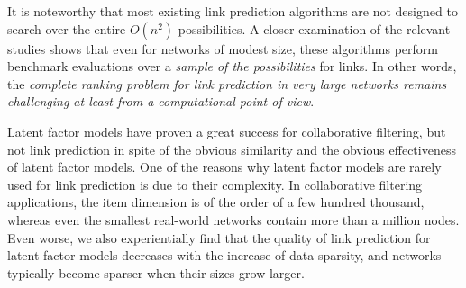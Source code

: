 It is noteworthy that most existing link prediction algorithms are not designed to search over the entire
$O(n^2)$ possibilities. A closer examination of the relevant
studies shows that even for networks of modest size, these
algorithms perform benchmark evaluations over a {\em
sample of the possibilities} for links.  In other
words, the {\em complete ranking problem for link prediction in
very large networks remains challenging at least from a
computational point of view}.


Latent factor models have proven a great success for
collaborative filtering, but not link prediction in spite of the obvious
similarity and
the obvious effectiveness of latent factor models. One of the reasons why latent factor models are rarely used for
link prediction is due to their complexity. In
collaborative filtering applications, the item dimension is of the
order of a few hundred thousand, whereas even the smallest  real-world networks contain more than a million nodes.
Even worse, we also experientially find that the quality of link prediction for latent factor models decreases with the increase of data sparsity,
and networks typically become sparser when their sizes grow larger.






